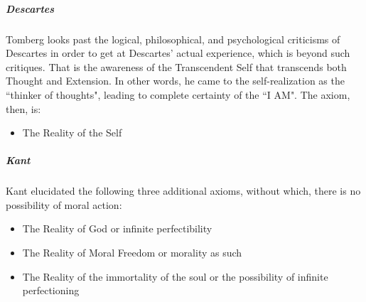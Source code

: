 \subparagraph{Descartes}
Tomberg looks past the logical, philosophical, and psychological criticisms of Descartes in order to get at Descartes' actual experience, which is beyond such critiques. That is the awareness of the Transcendent Self that transcends both Thought and Extension. In other words, he came to the self-realization as the ``thinker of thoughts", leading to complete certainty of the ``I AM". The axiom, then, is:

\begin{itemize}
\item The Reality of the Self 
\end{itemize}
\subparagraph{Kant}
Kant elucidated the following three additional axioms, without which, there is no possibility of moral action:

\begin{itemize}
\item The Reality of God or infinite perfectibility 
\item The Reality of Moral Freedom or morality as such 
\item The Reality of the immortality of the soul or the possibility of infinite perfectioning
\end{itemize}


